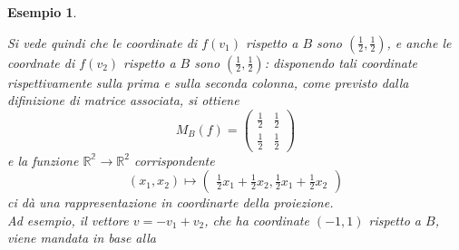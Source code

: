 \message{ !name(algebraegeometria.tex)}\documentclass{book}
\newtheorem{esempio}{Esempio}
\begin{document}
\begin{esempio}
\begin{enumerate}
\begin{figure}[th]
    \end{figure}
    Si vede quindi che le coordinate di $f(v_1)$ rispetto a $B$ sono $\left(\frac{1}{2},\frac{1}{2}\right)$, e
    anche le coordnate di $f(v_2)$ rispetto a $B$ sono $\left(\frac{1}{2},\frac{1}{2}\right)$: disponendo tali
    coordinate rispettivamente sulla prima e sulla seconda colonna, come previsto dalla difinizione di matrice
    associata, si ottiene
    \begin{equation*}
      M_B(f)=
      \begin{pmatrix}
        \frac{1}{2}&\frac{1}{2}\\
        \frac{1}{2} & \frac{1}{2}
      \end{pmatrix}
    \end{equation*}
    e la funzione $\mathds{R^2}\to \mathds{R}^2$ corrispondente
    \begin{equation}
      (x_1,x_2)\mapsto
      \begin{pmatrix}
        \frac{1}{2}x_1+\frac{1}{2}x_2, \frac{1}{2}x_1+\frac{1}{2}x_2
      \end{pmatrix}
    \end{equation}
    ci dà una rappresentazione in coordinarte della proiezione.\\
    Ad esempio, il vettore $v=-v_1+v_2$, che ha coordinate $(-1,1)$ rispetto a $B$, viene mandata in base alla
    
  \end{enumerate}
\end{esempio}
\end{document}
